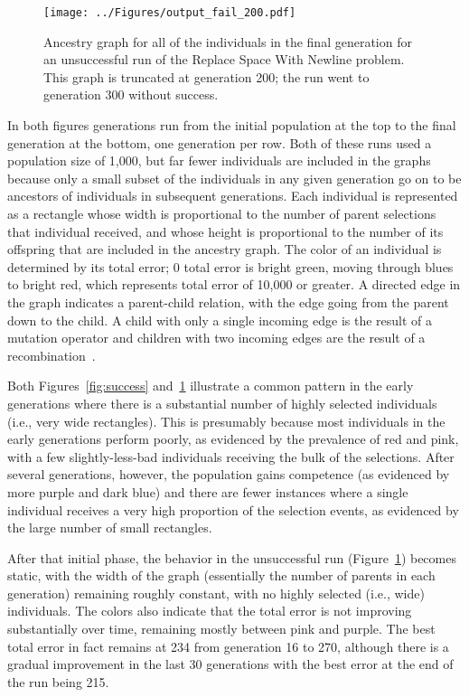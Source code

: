 \begin{figure}[tb]
	\centering
	\texttt{[image: ../Figures/output\_fail\_200.pdf]}
	\caption{Ancestry graph for all of the individuals in the final generation for an unsuccessful run of the Replace Space With Newline problem. This graph is truncated at generation 200; the run went to generation 300 without success.}
	\label{fig:fail}
	\vspace{-0.25cm}
\end{figure}

In both figures generations run from the initial population at the top to the final generation at the bottom, one generation per row. Both of these runs used a population size of 1,000, but far fewer individuals are included in the graphs because only a small subset of the individuals in any given generation go on to be ancestors of individuals in subsequent generations. Each individual is represented as a rectangle whose width is proportional to the number of parent selections that individual received, and whose height is proportional to the number of its offspring that are included in the ancestry graph. 
The color of an individual is determined by its total error; 0 total error is bright green, moving through blues to bright red, which represents total error of 10,000 or greater. A directed edge in the graph indicates a parent-child relation, with the edge going from the parent down to the child. A child with only a single incoming edge is the result of a mutation operator and children with two incoming edges are the result of a recombination~\cite{Helmuth:2015:dissertation}.

Both Figures~\ref{fig:success} and~\ref{fig:fail} illustrate a common pattern in the early generations where there is a substantial number of highly selected individuals (i.e., very wide rectangles). This is presumably because most individuals in the early generations perform poorly, as evidenced by the prevalence of red and pink, with a few slightly-less-bad individuals receiving the bulk of the selections. After several generations, however, the population gains competence (as evidenced by more purple and dark blue) and there are fewer instances where a single individual receives a very high proportion of the selection events, as evidenced by the large number of small rectangles.

After that initial phase, the behavior in the unsuccessful run (Figure~\ref{fig:fail}) becomes static, with the width of the graph (essentially the number of parents in each generation) remaining roughly constant, with no highly selected (i.e., wide) individuals. The colors also indicate that the total error is not improving substantially over time, remaining mostly between pink and purple. The best total error in fact remains at 234 from generation 16 to 270, although there is a gradual improvement in the last 30 generations with the best error at the end of the run being 215.

